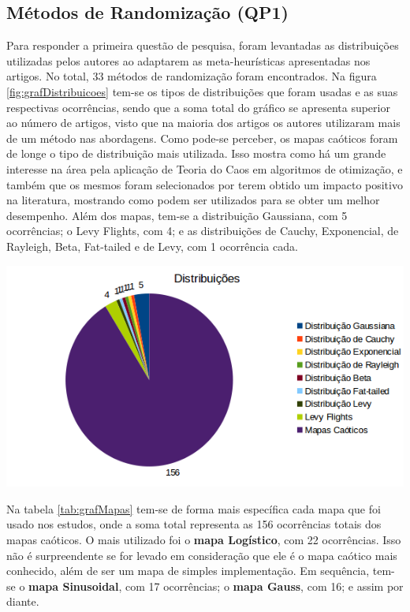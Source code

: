 \subsection{Métodos de Randomização (QP1)}

Para responder a primeira questão de pesquisa, foram levantadas as distribuições utilizadas pelos autores ao adaptarem as meta-heurísticas apresentadas nos artigos. No total, 33 métodos de randomização foram encontrados. Na figura \ref{fig:grafDistribuicoes} tem-se os tipos de distribuições que foram usadas e as suas respectivas ocorrências, sendo que a soma total do gráfico se apresenta superior ao número de artigos, visto que na maioria dos artigos os autores utilizaram mais de um método nas abordagens. Como pode-se perceber, os mapas caóticos foram de longe o tipo de distribuição mais utilizada. Isso mostra como há um grande interesse na área pela aplicação de Teoria do Caos em algoritmos de otimização, e também que os mesmos foram selecionados por terem obtido um impacto positivo na literatura, mostrando como podem ser utilizados para se obter um melhor desempenho. Além dos mapas, tem-se a distribuição Gaussiana, com 5 ocorrências; o Levy Flights, com 4; e as distribuições de Cauchy, Exponencial, de Rayleigh, Beta, Fat-tailed e de Levy, com 1 ocorrência cada.

{
    \centering
    \includegraphics[width=0.7\linewidth]{figuras/graficoDistribuicoes.png}
    \label{fig:grafDistribuicoes}
}

Na tabela \ref{tab:grafMapas} tem-se de forma mais específica cada mapa que foi usado nos estudos, onde a soma total representa as 156 ocorrências totais dos mapas caóticos. O mais utilizado foi o \textbf{mapa Logístico}, com 22 ocorrências. Isso não é surpreendente se for levado em consideração que ele é o mapa caótico mais conhecido, além de ser um mapa de simples implementação. Em sequência, tem-se o \textbf{mapa Sinusoidal}, com 17 ocorrências; o \textbf{mapa Gauss}, com 16; e assim por diante. 

